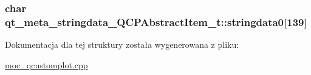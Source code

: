 \subsubsection[{\texorpdfstring{stringdata0}{stringdata0}}]{\setlength{\rightskip}{0pt plus 5cm}char qt\+\_\+meta\+\_\+stringdata\+\_\+\+Q\+C\+P\+Abstract\+Item\+\_\+t\+::stringdata0\mbox{[}139\mbox{]}}\hypertarget{structqt__meta__stringdata___q_c_p_abstract_item__t_a4a1f8f9acd2583f039a05de696c20ba6}{}\label{structqt__meta__stringdata___q_c_p_abstract_item__t_a4a1f8f9acd2583f039a05de696c20ba6}


Dokumentacja dla tej struktury została wygenerowana z pliku\+:\begin{DoxyCompactItemize}
\item 
\hyperlink{moc__qcustomplot_8cpp}{moc\+\_\+qcustomplot.\+cpp}\end{DoxyCompactItemize}
